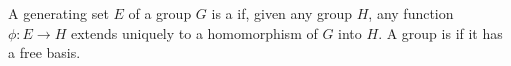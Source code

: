 A generating set $E$ of a group $G$ is a  if, given any group $H$, any function $\phi: E \to H$ extends uniquely to a homomorphism of $G$ into $H$. A group is  if it has a free basis.

